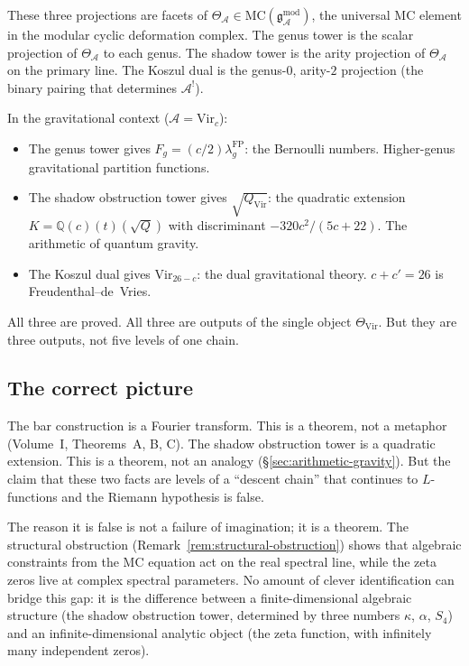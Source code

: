 \documentclass[11pt]{article}
\newcommand{\cA}{\mathcal{A}}
\newcommand{\Q}{\mathbb{Q}}
\newcommand{\gAmod}{\mathfrak{g}^{\mathrm{mod}}_\cA}
\begin{document}
These three projections are facets of $\Theta_\cA
\in \mathrm{MC}(\gAmod)$, the universal MC element in the
modular cyclic deformation complex.  The genus tower is the
scalar projection of $\Theta_\cA$ to each genus.  The shadow
tower is the arity projection of $\Theta_\cA$ on the primary
line.  The Koszul dual is the genus-$0$, arity-$2$ projection
(the binary pairing that determines $\cA^!$).

In the gravitational context ($\cA = \mathrm{Vir}_c$):
\begin{itemize}[nosep]
\item The genus tower gives $F_g = (c/2)\lambda_g^{\mathrm{FP}}$:
  the Bernoulli numbers.  Higher-genus gravitational partition
  functions.
\item The shadow obstruction tower gives $\sqrt{Q_{\mathrm{Vir}}}$: the
  quadratic extension $K = \Q(c)(t)(\sqrt{Q})$ with discriminant
  $-320c^2/(5c{+}22)$.  The arithmetic of quantum gravity.
\item The Koszul dual gives $\mathrm{Vir}_{26-c}$: the dual
  gravitational theory.  $c + c' = 26$ is Freudenthal--de~Vries.
\end{itemize}

All three are proved.  All three are outputs of the single
object $\Theta_{\mathrm{Vir}}$.  But they are three outputs, not
five levels of one chain.

\subsection{The correct picture}

The bar construction is a Fourier transform.  This is a theorem,
not a metaphor (Volume~I, Theorems~A, B, C).  The shadow obstruction tower
is a quadratic extension.  This is a theorem, not an analogy
(\S\ref{sec:arithmetic-gravity}).  But the claim that these two
facts are levels of a ``descent chain'' that continues to
$L$-functions and the Riemann hypothesis is false.

The reason it is false is not a failure of imagination; it is a
theorem.  The structural obstruction
(Remark~\ref{rem:structural-obstruction}) shows that algebraic
constraints from the MC equation act on the real spectral line,
while the zeta zeros live at complex spectral parameters.  No
amount of clever identification can bridge this gap: it is the
difference between a finite-dimensional algebraic structure
(the shadow obstruction tower, determined by three numbers $\kappa$, $\alpha$,
$S_4$) and an infinite-dimensional analytic object (the zeta
function, with infinitely many independent zeros).
\end{document}
